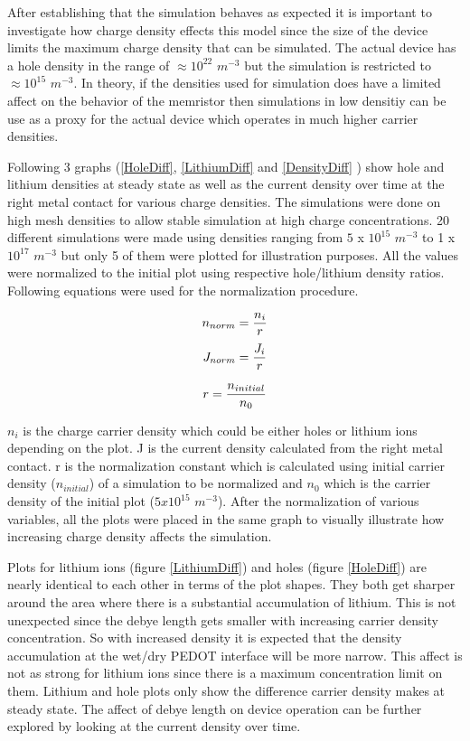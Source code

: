 \begin{doublespace}
After establishing that the simulation behaves as expected it is important to investigate how charge density effects this model since the size of the device limits the maximum charge density that can be simulated. The actual device has a hole density in the range of $ \approx 10^{22}$ $m^{-3}$ but the simulation is restricted to $\approx 10^{15}$ $m^{-3}$. In theory, if the densities used for simulation does have a limited affect on the behavior of the memristor then simulations in low densitiy can be use as a proxy for the actual device which operates in much higher carrier densities.

 Following 3 graphs (\ref{HoleDiff}, \ref{LithiumDiff} and \ref{DensityDiff} ) show hole and lithium densities at steady state as well as the current density over time at the right metal contact for various charge densities. The simulations were done on high mesh densities to allow stable simulation at high charge concentrations. 20 different simulations were made using densities ranging from $5$ x $10^{15}$  $m^{-3}$ to 1 x $10^{17}$  $m^{-3}$ but only 5 of them were plotted for illustration purposes. All the values were normalized to the initial plot using respective hole/lithium density ratios. Following equations were used for the normalization procedure.


\begin{equation}
\centering
n_{norm}= \frac{n_i}{r} 
\end{equation}
\begin{equation}
\centering
J_{norm}= \frac{J_i}{r} 
\end{equation}

\begin{equation}
\centering
r = \frac{n_{initial}}{n_{0}}
\label{NormConst}
\end{equation}

$n_{i}$ is the charge carrier density which could be either holes or lithium ions depending on the plot. J is the current density calculated from the right metal contact. r is the normalization constant which is calculated using initial carrier density ($n_{initial}$) of a simulation to be normalized and $n_{0}$ which is the carrier density of the initial plot ($5x10^{15}$ $m^{-3}$). After the normalization of various variables, all the plots were placed in the same graph to visually illustrate how increasing charge density affects the simulation. 

Plots for lithium ions (figure \ref{LithiumDiff}) and holes (figure \ref{HoleDiff}) are nearly identical to each other in terms of the plot shapes. They both get sharper around the area where there is a substantial accumulation of lithium. This is not unexpected since the debye length gets smaller with increasing carrier density concentration. So with increased density it is expected that the density accumulation at the wet/dry PEDOT interface will be more narrow. This affect is not as strong for lithium ions since there is a maximum concentration limit on them. Lithium and hole plots only show the difference carrier density makes at steady state. The affect of debye length on device operation can be further explored by looking at the current density over time.   


\end{doublespace}
